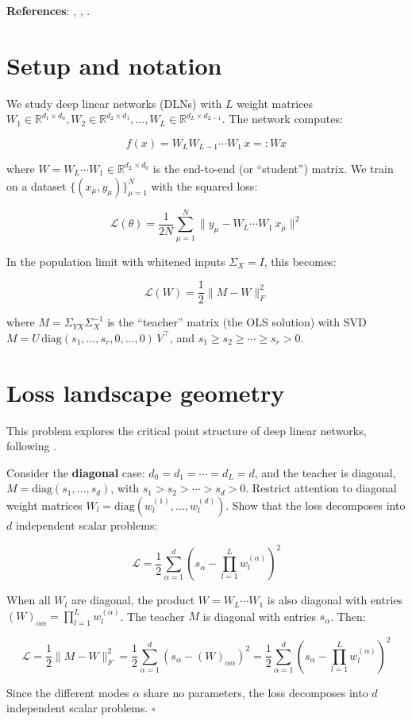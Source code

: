 \documentclass[11pt]{article}
\begin{document}
\textbf{References}: \cite{saxe2014}, \cite{achour2024}, \cite{tu2024}.

\section{Setup and notation}

We study deep linear networks (DLNs) with \(L\) weight matrices
\(W_1 \in \mathbb{R}^{d_1 \times d_0}, W_2 \in \mathbb{R}^{d_2 \times d_1}, \ldots, W_L \in \mathbb{R}^{d_L \times d_{L-1}}\).
The network computes:

\[f(x) = W_L W_{L-1} \cdots W_1 \, x =: W x\]

where \(W = W_L \cdots W_1 \in \mathbb{R}^{d_L \times d_0}\) is the
end-to-end (or ``student'') matrix. We train on a dataset
\(\{(x_\mu, y_\mu)\}_{\mu=1}^N\) with the squared loss:

\[\mathcal{L}(\theta) = \frac{1}{2N} \sum_{\mu=1}^{N} \|y_\mu - W_L \cdots W_1 \, x_\mu\|^2\]

In the population limit with whitened inputs \(\Sigma_X = I\), this
becomes:

\[\mathcal{L}(W) = \frac{1}{2}\|M - W\|_F^2\]

where \(M = \Sigma_{YX} \Sigma_X^{-1}\) is the ``teacher'' matrix (the
OLS solution) with SVD
\(M = U \,\text{diag}(s_1, \ldots, s_r, 0, \ldots, 0)\, V^\top\), and
\(s_1 \geq s_2 \geq \cdots \geq s_r > 0\).

\section{Loss landscape geometry}
\label{sec:td-geometry}

This problem explores the critical point structure of deep linear
networks, following \cite{achour2024}.

\begin{exercise}
\label{ex:td-1a}
Consider the \textbf{diagonal} case:
\(d_0 = d_1 = \cdots = d_L = d\), and the teacher is diagonal,
\(M = \text{diag}(s_1, \ldots, s_d)\), with
\(s_1 > s_2 > \cdots > s_d > 0\). Restrict attention to diagonal weight
matrices \(W_l = \text{diag}(w_l^{(1)}, \ldots, w_l^{(d)})\). Show that
the loss decomposes into \(d\) independent scalar problems:

\[\mathcal{L} = \frac{1}{2}\sum_{\alpha=1}^d \left(s_\alpha - \prod_{l=1}^L w_l^{(\alpha)}\right)^2\]
\end{exercise}

\begin{solution}[ex:td-1a]
When all \(W_l\) are diagonal, the product
\(W = W_L \cdots W_1\) is also diagonal with entries
\((W)_{\alpha\alpha} = \prod_{l=1}^L w_l^{(\alpha)}\). The teacher \(M\)
is diagonal with entries \(s_\alpha\). Then:

\[\mathcal{L} = \frac{1}{2}\|M - W\|_F^2 = \frac{1}{2}\sum_{\alpha=1}^d (s_\alpha - (W)_{\alpha\alpha})^2 = \frac{1}{2}\sum_{\alpha=1}^d \left(s_\alpha - \prod_{l=1}^L w_l^{(\alpha)}\right)^2\]

Since the different modes \(\alpha\) share no parameters, the loss
decomposes into \(d\) independent scalar problems. \(\square\)
\end{solution}
\end{document}
